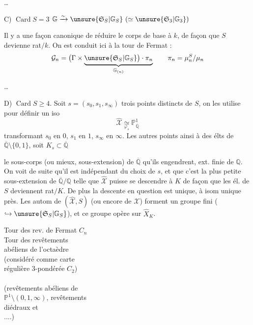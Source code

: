 \ldots

C) $\operatorname{Card}S=3$\qquad
$\mathbb G\xrightarrow{\sim}\unsure{\mathfrak S_S|\mathbb G_S}\ (\simeq\unsure{\mathfrak S_3|\mathbb G_3})$

Il y a une façon canonique de réduire le corps de base à $k$, de façon que $S$ devienne rat$/k$. On est conduit ici à la tour de Fermat :
\[
\mathcal G_n=\bigl(\Gamma\times
\underbrace{\unsure{\mathfrak S_S|\mathbb G_S}\bigr)\cdot\pi_n}_{\mathbb G_{(n)}}
\qquad \pi_n=\mu_n^S/\mu_n
\]

\ldots

D) $\operatorname{Card}S\geq4$. Soit $s=(s_0,s_1,s_\infty)$  trois points distincts de $S$, on les utilise pour définir un iso
\[
\widehat{\mathcal X}\underset{\varphi_s}{\simeq}\mathbb P^1_{\overline{\mathbb Q}}
\]
transformant $s_0$ en $0$, $s_1$ en $1$, $s_\infty$ en $\infty$. Les autres points   ainsi à des élts de $\overline{\mathbb Q}\setminus\{0,1\}$, soit $K_s\subset\overline{\mathbb Q}$

le sous-corps (ou mieux, sous-extension) de $\overline{\mathbb Q}$ qu'ils engendrent, ext. finie de $\mathbb Q$. On voit de suite qu'il est indépendant du choix de $s$, et que c'est la plus petite sous-extension de $\overline{\mathbb Q}/\mathbb Q$ telle que $\widehat{\mathcal X}$ puisse se descendre  à $K$ de façon que les él. de $S$ deviennent rat$/K$.
De plus la descente en question est unique, à isom unique près. Les autom  de $(\widehat{\mathcal X},S)$ (ou encore de $\mathcal X$) forment un groupe fini ($\hookrightarrow\unsure{\mathfrak S_S|\mathbb G_S}$), et ce groupe opère  sur $\widehat X_K$.

\begin{flushright}
Tour des rev. de Fermat $C_n$\\
Tour des revêtements\\
abéliens de l'octaèdre\\
(considéré comme carte\\
régulière 3-pondérée $C_2$)\\
\\
(revêtements abéliens de\\
$\mathbb P^1\setminus(0,1,\infty)$, revêtements\\
diédraux et \\
....)
\end{flushright}

